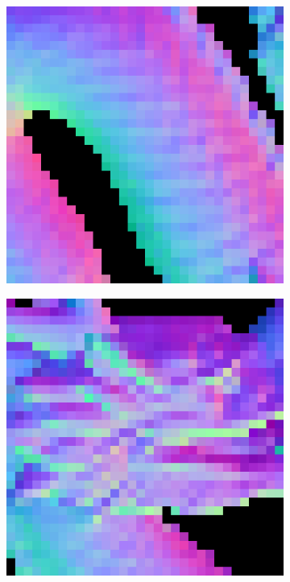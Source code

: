 \begin{figure}[H]
	\centering
	\begin{subfigure}[b]{0.18\linewidth}
		\includegraphics[width=\linewidth]{./Figures/trip_net_zoom_in/eval_7_22_-8_normal.png}
	\end{subfigure}
	\begin{subfigure}[b]{0.18\linewidth}
		\includegraphics[width=\linewidth]{./Figures/trip_net_zoom_in/eval_7_2_22_normal.png}

\end{subfigure}
\end{figure}

